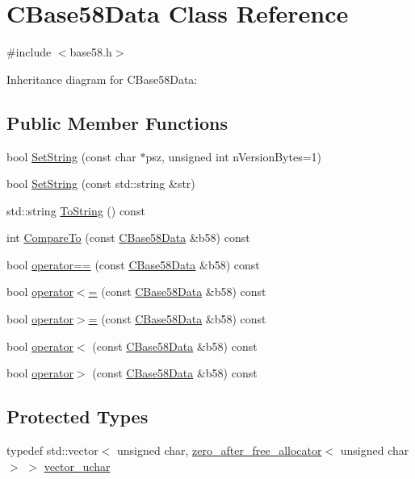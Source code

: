 \hypertarget{class_c_base58_data}{}\section{C\+Base58\+Data Class Reference}
\label{class_c_base58_data}


{\ttfamily \#include $<$base58.\+h$>$}



Inheritance diagram for C\+Base58\+Data\+:
\subsection*{Public Member Functions}
\begin{DoxyCompactItemize}
\item 
bool \hyperlink{class_c_base58_data_a250fa3bc97d03c7d87de5485c8b49b57}{Set\+String} (const char $\ast$psz, unsigned int n\+Version\+Bytes=1)
\item 
bool \hyperlink{class_c_base58_data_a8e0cba75a3e0a5b21defaf1471d8659c}{Set\+String} (const std\+::string \&str)
\item 
std\+::string \hyperlink{class_c_base58_data_a9a47b10dadff15b8d6a6d0e63ce3ae32}{To\+String} () const 
\item 
int \hyperlink{class_c_base58_data_ab3d18fd9671a383937af7dd4ac2e890a}{Compare\+To} (const \hyperlink{class_c_base58_data}{C\+Base58\+Data} \&b58) const 
\item 
bool \hyperlink{class_c_base58_data_af6448549abaf34142668540a338d180d}{operator==} (const \hyperlink{class_c_base58_data}{C\+Base58\+Data} \&b58) const 
\item 
bool \hyperlink{class_c_base58_data_a126cabad3af6b7d3aec0d6498be1a028}{operator$<$=} (const \hyperlink{class_c_base58_data}{C\+Base58\+Data} \&b58) const 
\item 
bool \hyperlink{class_c_base58_data_a4a96e8ea3716509b307cacfc814e5622}{operator$>$=} (const \hyperlink{class_c_base58_data}{C\+Base58\+Data} \&b58) const 
\item 
bool \hyperlink{class_c_base58_data_a39bac58c4bc4f8abc74a24b769eb1f1d}{operator$<$} (const \hyperlink{class_c_base58_data}{C\+Base58\+Data} \&b58) const 
\item 
bool \hyperlink{class_c_base58_data_a427e472d2fef51aaa89c1a09229ac51a}{operator$>$} (const \hyperlink{class_c_base58_data}{C\+Base58\+Data} \&b58) const 
\end{DoxyCompactItemize}
\subsection*{Protected Types}
\begin{DoxyCompactItemize}
\item 
typedef std\+::vector$<$ unsigned char, \hyperlink{structzero__after__free__allocator}{zero\+\_\+after\+\_\+free\+\_\+allocator}$<$ unsigned char $>$ $>$ \hyperlink{class_c_base58_data_a193d64487a0b4f6df24f8bd380956ec1}{vector\+\_\+uchar}
\end{DoxyCompactItemize}
